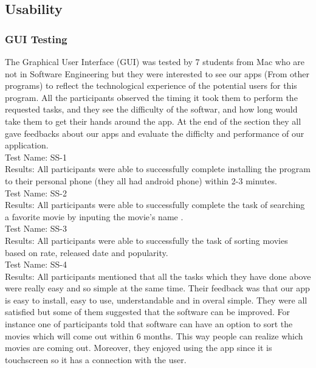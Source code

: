\documentclass[12pt, titlepage]{article}
\begin{document}
\subsection{Usability}
\subsubsection{GUI Testing}
The Graphical User Interface (GUI) was tested by 7 students from Mac who are not in Software Engineering but they were interested to see our apps (From other programs) to reflect the technological experience of the potential users for this program. All the participants observed the timing it took them to perform the requested tasks, and they see the difficulty of the softwar, and how long would take them to get their hands around the app. At the end of the section they all gave feedbacks about our apps and evaluate the difficlty and performance of our application.\\

	
Test Name: SS-1 \\
Results: All participants were able to successfully complete installing the program to their personal phone (they all had android phone) within 2-3 minutes.\\

Test Name: SS-2 \\
Results: All participants were able to successfully complete the task of searching a favorite movie by inputing the movie's name .\\

Test Name: SS-3 \\
Results: All participants were able to successfully the task of sorting movies based on rate, released date and popularity.\\


Test Name: SS-4 \\
Results: All participants mentioned that all the tasks which they have done above were really easy and so simple at the same time. Their feedback was that our app is easy to install, easy to use, understandable and in overal simple. They were all satisfied but some of them suggested that the software can be improved. For instance one of participants told that software can have an option to sort the movies which  will come out within 6 months. This way people can realize which movies are coming out. Moreover, they enjoyed using the app since it is touchscreen so it has a connection with the user. \\
\end{document}

